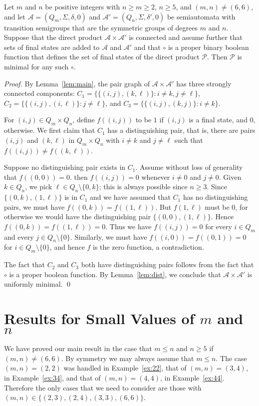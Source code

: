 \documentclass{llncs}
\newcommand{\Sig}{\Sigma}
\newcommand{\cA}{{\mathcal A}}
\newcommand{\cP}{{\mathcal P}}
\begin{document}
\begin{corollary}
Let $m$ and $n$ be positive integers with $n\ge m \ge 2$, $n\ge 5$, and $(m,n)\neq (6,6)$, and let $\cA=(Q_m,\Sig, \delta,0)$ and $\cA'=(Q_n,\Sig, \delta',0)$ be 
semiautomata with transition semigroups  that are the symmetric groups  of degrees $m$ and $n$. Suppose that the direct product $\cA\times \cA'$ is connected and assume further that sets of final states are added to $\cA$ and $\cA'$ and that $\circ$ is a proper binary boolean function that defines the set of final states of the direct product $\cP$. Then $\cP$ is minimal for any such $\circ$.
\label{cor:main}

\end{corollary}
\begin{proof} 
By Lemma~\ref{lem:main}, the pair graph of $\cA\times \cA'$ has three strongly connected components:
$C_1=\{\{(i,j), (k,\ell)\}\colon i\neq k, j\neq \ell\}$, $C_2=\{\{(i,j), (i,\ell)\}\colon j\neq \ell\}$, and 
$C_3=\{\{(i,j), (k,j)\}\colon i\neq k\}$.  

For $(i,j)\in Q_m\times Q_n$, define $f((i,j))$ to be $1$ if $(i,j)$ is a final state, and  $0$, otherwise.  We first claim that $C_1$ has a distinguishing pair, that is, there are pairs $(i,j)$ and $(k,\ell)$ in $Q_m\times Q_n$ with $i\neq k$ and $j\neq \ell$ such that $f((i,j))\neq f((k,\ell))$.  

Suppose no distinguishing pair exists in $C_1$.
Assume without loss of generality that $f((0,0))=0$.
 then $f((i,j))=0$ whenever $i\neq 0$ and $j\neq 0$.  
Given $k\in Q_n$, we pick $\ell\in Q_n\setminus \{0,k\}$; this is always possible since $n\ge 3$.  
Since $\{(0,k),(1,\ell)\}$ is in $C_1$ and we have assumed that $C_1$ has no distinguishing pairs, we must have $f((0,k))=f((1,\ell))$.
But $f(1,\ell)$ must be 0, for otherwise we would have the distinguishing pair $\{(0,0),(1,\ell)\}$.
Hence $f((0,k))=f((1,\ell))=0$.   
Thus we have
$f((i,j))=0$ for every $i\in Q_m$ and every $j\in Q_n\setminus \{0\}$.  
Similarly, we must have $f((i,0))=f((0,1))=0$ for $i\in Q_m\setminus \{0\}$,  and hence $f$ is the zero function, a contradiction.  

The fact that $C_2$ and $C_3$ both have distinguishing pairs follows from the fact that $\circ$ is a proper boolean function.
By Lemma~\ref{lem:dist}, we conclude that  $\cA\times \cA'$ is uniformly minimal.
\qed
\end{proof}


\section{Results for Small Values of $m$ and $n$}
\label{sec:small}
We have proved our main result in the case that $m\le n$ and $n\ge 5$ if $(m,n)\neq (6,6)$.  By symmetry we may always assume that $m\le n$.  The case $(m,n)=(2,2)$ was handled in Example~\ref{ex:22}, that of $(m,n)=(3,4)$, in Example~\ref{ex:34}, and that
of $(m,n)=(4,4)$, in Example~\ref{ex:44}. Therefore the only cases that we need to consider are those with $(m,n)\in \{(2,3),(2,4),(3,3),(6,6)\}$.  
\end{document}
